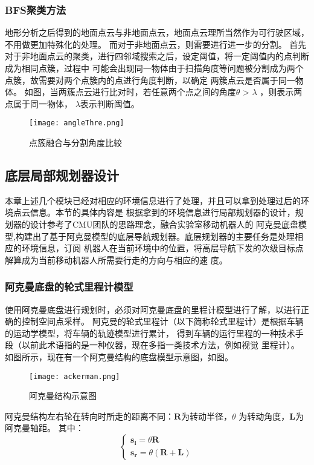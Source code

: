 \subsubsection{BFS聚类方法}
地形分析之后得到的地面点云与非地面点云，地面点云理所当然作为可行驶区域，不用做更加特殊化的处理。
而对于非地面点云，则需要进行进一步的分割。
首先对于非地面点云的聚类，进行四邻域搜索之后，设定阈值，将一定阈值内的点判断成为相同点簇，过程中
可能会出现同一物体由于扫描角度等问题被分割成为两个点簇，故需要对两个点簇内的点进行角度判断，以确定
两簇点云是否属于同一物体。
如图，当两簇点云进行比对时，若任意两个点之间的角度$\theta$ > $\lambda$ ，则表示两点属于同一物体，
$\lambda$表示判断阈值。
\begin{figure}[ht]
    \centering
    \texttt{[image: angleThre.png]}
    \caption{点簇融合与分割角度比较}
\end{figure}

\subsection{底层局部规划器设计}
本章上述几个模块已经对相应的环境信息进行了处理，并且可以拿到处理过后的环境点云信息。本节的具体内容是
根据拿到的环境信息进行局部规划器的设计，规划器的设计参考了CMU团队的思路理念，融合实验室移动机器人的
阿克曼底盘模型,构建出了基于阿克曼模型的底层导航规划器。底层规划器的主要任务是处理相应的环境信息，订阅
机器人在当前环境中的位置，将高层导航下发的次级目标点解算成为当前移动机器人所需要行走的方向与相应的速
度。


\subsubsection{阿克曼底盘的轮式里程计模型}
使用阿克曼底盘进行规划时，必须对阿克曼底盘的里程计模型进行了解，以进行正确的控制空间点采样。
阿克曼的轮式里程计（以下简称轮式里程计）是根据车辆的运动学模型，将车辆的轨迹模型进行累计，
得到车辆的运行里程的一种技术手段（以前此术语指的是一种仪器，现在多指一类技术方法，例如视觉
里程计）。
如图所示，现在有一个阿克曼结构的底盘模型示意图，如图。
\begin{figure}[ht]
    \centering
    \texttt{[image: ackerman.png]}
    \caption{阿克曼结构示意图}
\end{figure}

阿克曼结构左右轮在转向时所走的距离不同：$\symbf{R}$为转动半径，$\theta$ 为转动角度，$\symbf{L}$为阿克曼轴距。
其中：
\begin{equation}
    \begin{cases}
        \symbf{s}_{\symbf{l}} = \theta \symbf{R}\\
        \symbf{s}_{\symbf{r}} = \theta (\symbf{R} + \symbf{L})        
    \end{cases}
\end{equation}

